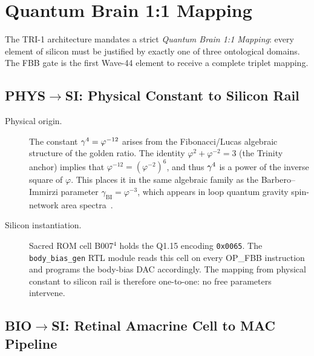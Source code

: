 \medskip
\noindent\anchorline{}

\section{Quantum Brain 1:1 Mapping}
\label{sec:quantum-brain}

The TRI-1 architecture mandates a strict \emph{Quantum Brain 1:1 Mapping}:
every element of silicon must be justified by exactly one of three
ontological domains.  The FBB gate is the first Wave-44 element to receive
a complete triplet mapping.

\subsection{PHYS\texorpdfstring{$\to$}{to}SI: Physical Constant to Silicon Rail}
\label{subsec:phys-si}

\begin{description}
  \item[Physical origin.]
    The constant $\gamma^{4}{} = \varphi^{-12}{}$ arises from the
    Fibonacci/Lucas algebraic structure of the golden ratio.
    The identity $\varphi^{2} + \varphi^{-2} = 3$ (the Trinity anchor)
    implies that $\varphi^{-12} = (\varphi^{-2})^{6}$, and thus
    $\gamma^{4}{}$ is a power of the inverse square of $\varphi$.
    This places it in the same algebraic family as the Barbero--Immirzi
    parameter $\gamma_{\mathrm{BI}} = \varphi^{-3}$, which appears in
    loop quantum gravity spin-network area spectra~\cite{TrinityAnchor2026}.
  \item[Silicon instantiation.]
    Sacred ROM cell B007$^{4}$ holds the Q1.15 encoding \texttt{0x0065}.
    The \texttt{body\_bias\_gen} RTL module reads this cell on every
    OP\_FBB instruction and programs the body-bias DAC accordingly.
    The mapping from physical constant to silicon rail is therefore
    one-to-one: no free parameters intervene.
\end{description}

\subsection{BIO\texorpdfstring{$\to$}{to}SI: Retinal Amacrine Cell to MAC Pipeline}
\label{subsec:bio-si}

